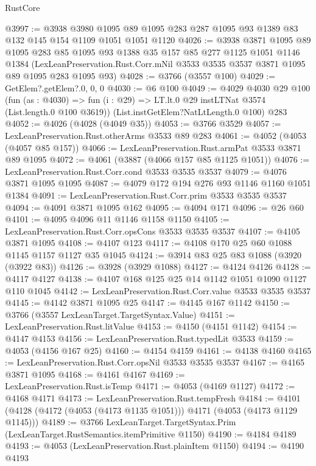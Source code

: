 \begin{lexlean}{RustCore}
\begin{coremodule}
@3997 := @3938
    @3980
    @1095
    @89
    @1095
    @283
    @287
    @1095
    @93
    @1389
    @83
    @132
    @145
    @154
    @1109
    @1051
    @1051
    @1120
@4026 := @3938
    @3871
    @1095
    @89
    @1095
    @283
    @85
    @1095
    @93
    @1388
    @35
    @157
    @85
    @277
    @1125
    @1051
    @1146
    @1384
    (LexLeanPreservation.Rust.Corr.mNil @3533 @3535 @3537 @3871 @1095 @89 @1095 @283 @1095 @93)
@4028 := @3766 (@3557 @100)
@4029 := GetElem?.getElem?.{0, 0, 0}
@4030 := @6 @100
@4049 := @4029
    @4030
    @29
    @100
    (fun (as : @4030) =>
    fun (i : @29) => LT.lt.{0} @29 instLTNat @3574 (List.length.{0} @100 @3619))
    (List.instGetElem?NatLtLength.{0} @100)
    @283
@4052 := @4026 (@4028 (@4049 @35))
@4053 := @3766 @3529
@4057 := LexLeanPreservation.Rust.otherArms @3533 @89 @283
@4061 := @4052 (@4053 (@4057 @85 @157))
@4066 := LexLeanPreservation.Rust.armPat @3533 @3871 @89 @1095
@4072 := @4061 (@3887 (@4066 @157 @85 @1125 @1051))
@4076 := LexLeanPreservation.Rust.Corr.cond @3533 @3535 @3537
@4079 := @4076 @3871 @1095 @1095
@4087 := @4079 @172 @194 @276 @93 @1146 @1160 @1051 @1384
@4091 := LexLeanPreservation.Rust.Corr.prim @3533 @3535 @3537
@4094 := @4091 @3871 @1095 @162
@4095 := @4094 @171
@4096 := @26 @60
@4101 := @4095 @4096 @11 @1146 @1158 @1150
@4105 := LexLeanPreservation.Rust.Corr.opsCons @3533 @3535 @3537
@4107 := @4105 @3871 @1095
@4108 := @4107 @123
@4117 := @4108 @170 @25 @60 @1088 @1145 @1157 @1127 @35 @1045
@4124 := @3914 @83 @25 @83 @1088 (@3920 (@3922 @83))
@4126 := @3928 (@3929 @1088)
@4127 := @4124 @4126
@4128 := @4117 @4127
@4138 := @4107 @168 @125 @25 @14 @1142 @1051 @1090 @1127 @110 @1045
@4142 := LexLeanPreservation.Rust.Corr.value @3533 @3535 @3537
@4145 := @4142 @3871 @1095 @25
@4147 := @4145 @167 @1142
@4150 := @3766 (@3557 LexLeanTarget.TargetSyntax.Value)
@4151 := LexLeanPreservation.Rust.litValue
@4153 := @4150 (@4151 @1142)
@4154 := @4147 @4153
@4156 := LexLeanPreservation.Rust.typedLit @3533
@4159 := @4053 (@4156 @167 @25)
@4160 := @4154 @4159
@4161 := @4138 @4160
@4165 := LexLeanPreservation.Rust.Corr.opsNil @3533 @3535 @3537
@4167 := @4165 @3871 @1095
@4168 := @4161 @4167
@4169 := LexLeanPreservation.Rust.isTemp
@4171 := @4053 (@4169 @1127)
@4172 := @4168 @4171
@4173 := LexLeanPreservation.Rust.tempFresh
@4184 := @4101 (@4128 (@4172 (@4053 (@4173 @1135 @1051))) @4171 (@4053 (@4173 @1129 @1145)))
@4189 := @3766 LexLeanTarget.TargetSyntax.Prim (LexLeanTarget.RustSemantics.itemPrimitive @1150)
@4190 := @4184 @4189
@4193 := @4053 (LexLeanPreservation.Rust.plainItem @1150)
@4194 := @4190 @4193

\end{coremodule}
\end{lexlean}
